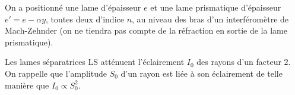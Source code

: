 


\finEntrainement







\hauteurLargeurCadreReponse		{6mm}{2.5cm}
\initialisationEntrainement

                                \initialisationPartieGauche %
On a positionné une lame d'épaisseur $e$ et une lame prismatique d'épaisseur $e' = e - \alpha y$, toutes deux d'indice $n$, au niveau des bras d'un interféromètre de Mach-Zehnder (on ne tiendra pas compte de la réfraction en sortie de la lame prismatique).

Les lames séparatrices LS atténuent l'éclairement $I_0$ des rayons d'un facteur $2$. On rappelle que l'amplitude $S_0$ d'un rayon est liée à son éclairement de telle manière que $I_0 \propto S^2_0$.

